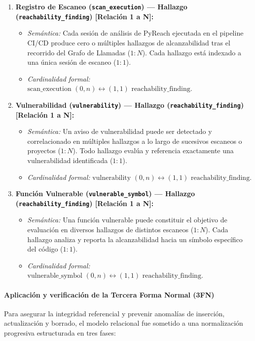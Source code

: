 \begin{enumerate}
    \item \textbf{Registro de Escaneo (\texttt{scan\_\allowbreak execution}) --- Hallazgo (\texttt{reachability\_\allowbreak finding}) [Relación 1 a N]:}
    \begin{itemize}
        \item \textit{Semántica:} Cada sesión de análisis de PyReach ejecutada en el pipeline CI/CD produce cero o múltiples hallazgos de alcanzabilidad tras el recorrido del Grafo de Llamadas ($1:N$). Cada hallazgo está indexado a una única sesión de escaneo ($1:1$).
        \item \textit{Cardinalidad formal:} $\text{scan\_execution } (0, n) \longleftrightarrow (1, 1) \text{ reachability\_finding}$.
    \end{itemize}

    \item \textbf{Vulnerabilidad (\texttt{vulnerability}) --- Hallazgo (\texttt{reachability\_\allowbreak finding}) [Relación 1 a N]:}
    \begin{itemize}
        \item \textit{Semántica:} Un aviso de vulnerabilidad puede ser detectado y correlacionado en múltiples hallazgos a lo largo de sucesivos escaneos o proyectos ($1:N$). Todo hallazgo evalúa y referencia exactamente una vulnerabilidad identificada ($1:1$).
        \item \textit{Cardinalidad formal:} $\text{vulnerability } (0, n) \longleftrightarrow (1, 1) \text{ reachability\_finding}$.
    \end{itemize}

    \item \textbf{Función Vulnerable (\texttt{vulnerable\_\allowbreak symbol}) --- Hallazgo (\texttt{reachability\_\allowbreak finding}) [Relación 1 a N]:}
    \begin{itemize}
        \item \textit{Semántica:} Una función vulnerable puede constituir el objetivo de evaluación en diversos hallazgos de distintos escaneos ($1:N$). Cada hallazgo analiza y reporta la alcanzabilidad hacia un símbolo específico del código ($1:1$).
        \item \textit{Cardinalidad formal:} $\text{vulnerable\_symbol } (0, n) \longleftrightarrow (1, 1) \text{ reachability\_finding}$.
    \end{itemize}
\end{enumerate}

\paragraph*{Aplicación y verificación de la Tercera Forma Normal (3FN)}
Para asegurar la integridad referencial y prevenir anomalías de inserción, actualización y borrado, el modelo relacional fue sometido a una normalización progresiva estructurada en tres fases:

